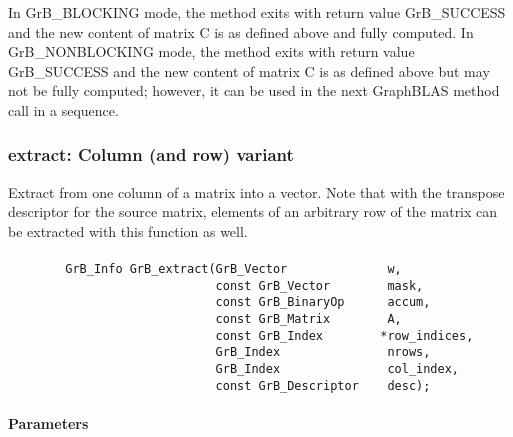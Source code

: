 In {\sf GrB\_BLOCKING} mode, the method exits with return value 
{\sf GrB\_SUCCESS} and the new content of matrix {\sf C} is as defined above
and fully computed.  
In {\sf GrB\_NONBLOCKING} mode, the method exits with return value 
{\sf GrB\_SUCCESS} and the new content of matrix {\sf C} is as defined above 
but may not be fully computed; however, it can be used in the next GraphBLAS 
method call in a sequence.

\subsubsection{{\sf extract}: Column (and row) variant}

Extract from one column of a matrix into a vector.  Note that with the transpose
descriptor for the source matrix, elements of an arbitrary row of the matrix
can be extracted with this function as well.

\paragraph{\syntax}

\begin{verbatim}
        GrB_Info GrB_extract(GrB_Vector              w,
                             const GrB_Vector        mask,
                             const GrB_BinaryOp      accum,
                             const GrB_Matrix        A,
                             const GrB_Index        *row_indices,
                             GrB_Index               nrows,
                             GrB_Index               col_index,
                             const GrB_Descriptor    desc); 
\end{verbatim}

\paragraph{Parameters}

